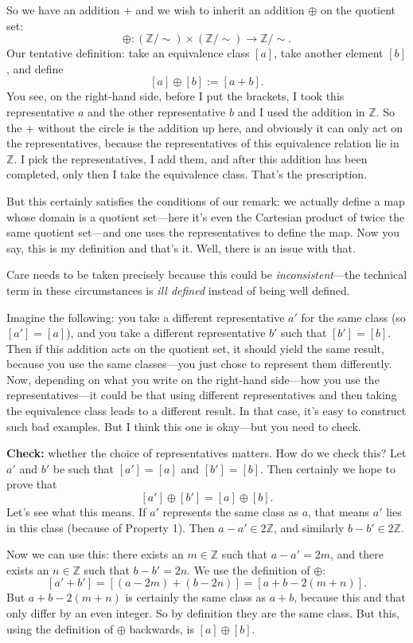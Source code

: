 So we have an addition $+$ and we wish to inherit an addition $\oplus$ on the quotient set:
\[
\oplus : (\mathbb{Z}/{\sim}) \times (\mathbb{Z}/{\sim}) \to \mathbb{Z}/{\sim}.
\]
Our tentative definition: take an equivalence class $[a]$, take another element $[b]$, and define
\[
[a] \oplus [b] := [a + b].
\]
You see, on the right-hand side, before I put the brackets, I took this representative $a$ and the other representative $b$ and I used the addition in $\mathbb{Z}$. So the $+$ without the circle is the addition up here, and obviously it can only act on the representatives, because the representatives of this equivalence relation lie in $\mathbb{Z}$. I pick the representatives, I add them, and after this addition has been completed, only then I take the equivalence class. That's the prescription.

But this certainly satisfies the conditions of our remark: we actually define a map whose domain is a quotient set---here it's even the Cartesian product of twice the same quotient set---and one uses the representatives to define the map. Now you say, this is my definition and that's it. Well, there is an issue with that.

Care needs to be taken precisely because this could be \emph{inconsistent}---the technical term in these circumstances is \emph{ill defined} instead of being well defined.

Imagine the following: you take a different representative $a'$ for the same class (so $[a'] = [a]$), and you take a different representative $b'$ such that $[b'] = [b]$. Then if this addition acts on the quotient set, it should yield the same result, because you use the same classes---you just chose to represent them differently. Now, depending on what you write on the right-hand side---how you use the representatives---it could be that using different representatives and then taking the equivalence class leads to a different result. In that case, it's easy to construct such bad examples. But I think this one is okay---but you need to check.

\textbf{Check:} whether the choice of representatives matters. How do we check this? Let $a'$ and $b'$ be such that $[a'] = [a]$ and $[b'] = [b]$. Then certainly we hope to prove that
\[
[a'] \oplus [b'] = [a] \oplus [b].
\]
Let's see what this means. If $a'$ represents the same class as $a$, that means $a'$ lies in this class (because of Property 1). Then $a - a' \in 2\mathbb{Z}$, and similarly $b - b' \in 2\mathbb{Z}$.

Now we can use this: there exists an $m \in \mathbb{Z}$ such that $a - a' = 2m$, and there exists an $n \in \mathbb{Z}$ such that $b - b' = 2n$. We use the definition of $\oplus$:
\[
[a' + b'] = [(a - 2m) + (b - 2n)] = [a + b - 2(m + n)].
\]
But $a + b - 2(m+n)$ is certainly the same class as $a + b$, because this and that only differ by an even integer. So by definition they are the same class. But this, using the definition of $\oplus$ backwards, is $[a] \oplus [b]$.

